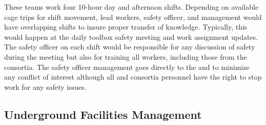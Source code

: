 These teams work four 10-hour day and afternoon shifts.  Depending on
available cage trips for shift movement, lead workers,
safety officer, and management would have overlapping shifts to insure 
proper transfer of knowledge.  Typically, this would happen at the daily
toolbox safety meeting and work assignment updates.  The safety
officer on each shift would be responsible for any discussion of safety
during the meeting but also for training all workers, including those from
the consortia. The safety officer management goes directly to the \surf
and   to minimize any conflict of interest although 
all  and consortia personnel have the right to stop
work for any safety issues.

\subsection{Underground Facilities Management}

